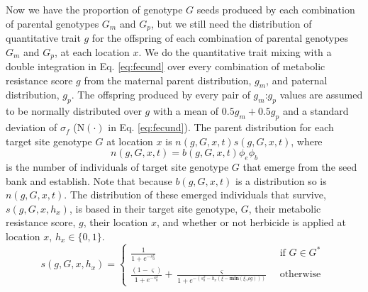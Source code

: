 \documentclass[12pt, a4paper]{article}
\begin{document}
Now we have the proportion of genotype $G$ seeds produced by each combination of parental genotypes $G_m$ and $G_p$, but we still need the distribution of quantitative trait $g$ for the offspring of each combination of parental genotypes $G_m$ and $G_p$, at each location $x$. We do the quantitative trait mixing with a double integration in Eq. \ref{eq:fecund} over every combination of metabolic resistance score $g$ from the maternal parent distribution, $g_m$, and paternal distribution, $g_p$. The offspring produced by every pair of $g_m$:$g_p$ values are assumed to be normally distributed over $g$ with a mean of $0.5g_m + 0.5g_p$ and a standard deviation of $\sigma_f$ ($\text{N}(\cdot)$ in Eq. \ref{eq:fecund}). The parent distribution for each target site genotype $G$ at location $x$ is $n(g, G, x, t)s(g, G, x, t)$, where 
\begin{equation}\label{eq:above_ground}
	n(g, G, x, t) = b(g, G, x, t)\phi_e\phi_b
\end{equation}
is the number of individuals of target site genotype $G$ that emerge from the seed bank and establish. Note that because $b(g, G, x, t)$ is a distribution so is $n(g, G, x, t)$. The distribution of these emerged individuals that survive, $s(g, G, x, h_x)$, is based in their target site genotype, $G$, their metabolic resistance score, $g$, their location $x$, and whether or not herbicide is applied at location $x$, $h_x \in \{0, 1\}$.   
\begin{equation}\label{eq:sur_G}
	s(g, G, x, h_x) = \begin{cases} 
		\frac{1}{1 + e^{-s_0^x}} &\text{~if~} G \in G^* \\
		\frac{(1 - \varsigma)}{1 + e^{-s_0^x}} + \frac{\varsigma}{1 + e^{-\left(s_0^x - h_x\left(\xi - \textbf{min}(\xi, \rho g) \right)\right)}} &\text{~otherwise~} 		
	\end{cases} 
\end{equation}
\end{document}
